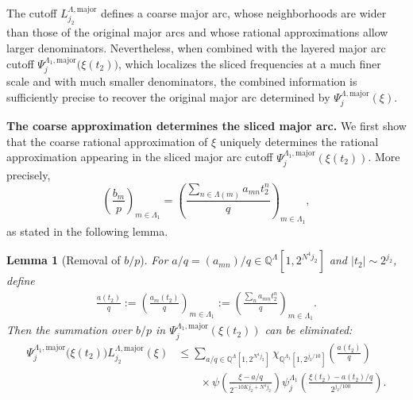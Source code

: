\documentclass[10pt,a4paper]{amsart}
\newtheorem{lemma}{Lemma}\numberwithin{lemma}{section}
\numberwithin{equation}{section}
\begin{document}
The cutoff $L^{\Lambda,\mathrm{major}}_{j_2}$ defines a coarse major arc, whose neighborhoods are wider than those of the original major arcs and whose rational approximations allow larger denominators. Nevertheless, when combined with the layered major arc cutoff
$\Psi^{\Lambda_1,\mathrm{major}}_{j}\bigl(\xi(t_2)\bigr)$,
which localizes the sliced frequencies at a much finer scale and with much smaller denominators, the combined information is sufficiently precise to recover the original major arc determined by
$\Psi^{\Lambda,\mathrm{major}}_{j}(\xi)$.

\medskip

\noindent
{\bf The coarse approximation determines the sliced major arc.}
We first show that the coarse rational approximation of $\xi$ uniquely determines the rational approximation appearing in the sliced major arc cutoff
$\Psi_j^{\Lambda_1,\mathrm{major}}(\xi(t_2))$.
More precisely,
\[
\left(\frac{b_m}{p}\right)_{m\in\Lambda_1}
=
\left(
\frac{\sum_{n\in\Lambda(m)}a_{mn}t_2^n}{q}
\right)_{m\in\Lambda_1},
\]
as stated in the following lemma.

\begin{lemma}[Removal of $b/p$]\label{lem31}
For
$a/q=(a_{mn})/q\in\mathbb{Q}^{\Lambda}[1,2^{N^4j_2}]$
and $|t_2|\sim2^{j_2}$, define
\begin{align*}
\frac{a(t_2)}{q}
:=
\left(
\frac{a_m(t_2)}{q}
\right)_{m\in\Lambda_1}
:=
\left(
\frac{\sum_n a_{mn}t_2^n}{q}
\right)_{m\in\Lambda_1}.
\end{align*}
Then the summation over $b/p$ in
$\Psi_j^{\Lambda_1,\mathrm{major}}(\xi(t_2))$
can be eliminated:
\begin{align}\label{345}
\Psi^{\Lambda_1,\mathrm{major}}_{j}\bigl(\xi(t_2)\bigr)
L^{\Lambda,\mathrm{major}}_{j_2}(\xi)
&\le
\sum_{a/q\in\mathbb Q^\Lambda[1,2^{N^4j_2}]}
\chi_{\mathbb Q^{\Lambda_1}[1,2^{j_2/10}]}
\!\left(\frac{a(t_2)}{q}\right)
\\
&\qquad\times
\psi\!\left(
\frac{\xi-a/q}{2^{-10Kj_2+N^4j_2}}
\right)
\psi^{\Lambda_1}_{j}\!\left(
\frac{\xi(t_2)-a(t_2)/q}{2^{j_2/100}}
\right).\nonumber
\end{align}


 

 
\end{lemma}
\end{document}
